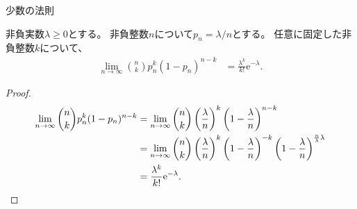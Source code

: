 \documentclass[lualatex,handout]{beamer}
\theoremstyle{definition}
\begin{document}
\begin{frame}{少数の法則}
\begin{theorem}[少数の法則]
非負実数$\lambda\ge 0$とする。
非負整数$n$について$p_n=\lambda/n$とする。
任意に固定した非負整数$k$について、
\begin{align*}
\lim_{n\to\infty} \binom{n}{k} p_n^k(1-p_n)^{n-k} &= \frac{\lambda^k}{k!}\mathrm{e}^{-\lambda}.
\end{align*}
\end{theorem}
\begin{proof}
\begin{align*}
\lim_{n\to\infty} \binom{n}{k} p_n^k(1-p_n)^{n-k} &= \lim_{n\to\infty} \binom{n}{k} \left(\frac{\lambda}{n}\right)^k\left(1-\frac{\lambda}{n}\right)^{n-k}\\
&= \lim_{n\to\infty} \binom{n}{k} \left(\frac{\lambda}{n}\right)^k\left(1-\frac{\lambda}{n}\right)^{-k}\left(1-\frac{\lambda}{n}\right)^{\frac{n}{\lambda}\lambda}\\
&= \frac{\lambda^k}{k!} \mathrm{e}^{-\lambda}.\qedhere
\end{align*}
\end{proof}
\end{frame}
\end{document}
